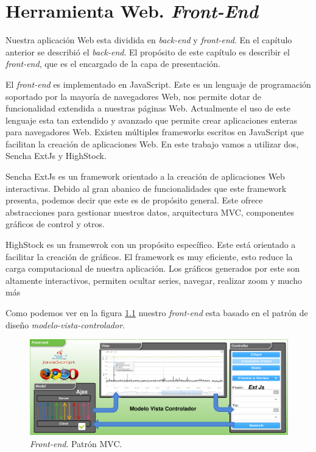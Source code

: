\chapter{Herramienta Web. \emph{Front-End}}
\label{frontend}
Nuestra aplicación Web esta dividida en \emph{back-end} y \emph{front-end}. En el capítulo anterior se describió el \emph{back-end}. El propósito de
este capítulo es describir el \emph{front-end}, que es el encargado de la capa de presentación.
\par
El \emph{front-end} es implementado en JavaScript\cite{JavaScript}. Este es un lenguaje de programación soportado por la mayoría de navegadores Web,
nos permite dotar de funcionalidad extendida a nuestras páginas Web. Actualmente el uso de este lenguaje esta tan extendido y avanzado que permite
crear aplicaciones enteras para navegadores Web. Existen múltiples frameworks escritos en JavaScript que facilitan la creación de aplicaciones Web. En
este trabajo vamos a utilizar dos, Sencha ExtJs\cite{ExtJs} y HighStock\cite{HighStock}.
\par
Sencha ExtJs es un framework orientado a la creación de aplicaciones Web interactivas. Debido al gran abanico de funcionalidades que este framework
presenta, podemos decir que este es de propósito general. Este ofrece abstracciones para gestionar nuestros datos, arquitectura MVC, componentes
gráficos de control y otros.
\par
HighStock es un framewrok con un propósito específico. Este está orientado a facilitar la creación de gráficos. El framework es muy eficiente, esto
reduce la carga computacional de nuestra aplicación. Los gráficos generados por este son altamente interactivos, permiten ocultar series, navegar,
realizar zoom y mucho más
\par
Como podemos ver en la figura \ref{fig:frontend} nuestro \emph{front-end} esta basado en el patrón de diseño 
\emph{modelo-vista-controlador}\cite{MVCWiki}.
\begin{figure}[h]
	\centering
	\includegraphics[keepaspectratio, width=1\textwidth]{./img/frontend.png}
	\caption{\emph{Front-end}. Patrón MVC.}   
	\label{fig:frontend}
\end{figure}
